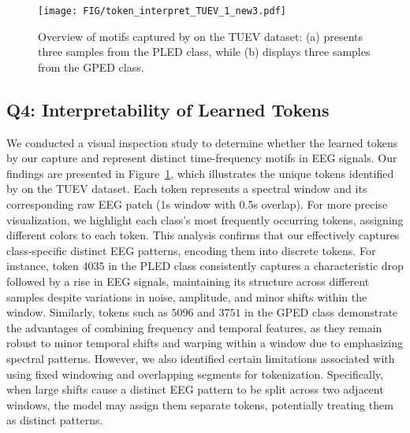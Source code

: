 
\begin{figure}[t]
    \centering
    \texttt{[image: FIG/token\_interpret\_TUEV\_1\_new3.pdf]}
    \caption{Overview of motifs captured by \tokenizer on the TUEV dataset: (a) presents three samples from the PLED class, while (b) displays three samples from the GPED class.
    }
    \label{fig:interpret_TUEV_1}
\end{figure}
\subsection{Q4: Interpretability of Learned Tokens}
\label{sec:Q6}
We conducted a visual inspection study to determine whether the learned tokens by our \tokenizer capture and represent distinct time-frequency motifs in EEG signals. Our findings are presented in Figure~\ref{fig:interpret_TUEV_1}, which illustrates the unique tokens identified by \tokenizer on the TUEV dataset. 
Each token represents a spectral window and its corresponding raw EEG patch (1s window with 0.5s overlap). For more precise visualization, we highlight each class's most frequently occurring tokens, assigning different colors to each token. This analysis confirms that our \tokenizer effectively captures class-specific distinct EEG patterns, encoding them into discrete tokens. For instance, token $4035$ in the PLED class consistently captures a characteristic drop followed by a rise in EEG signals, maintaining its structure across different samples despite variations in noise, amplitude, and minor shifts within the window. Similarly, tokens such as $5096$ and $3751$ in the GPED class demonstrate the advantages of combining frequency and temporal features, as they remain robust to minor temporal shifts and warping within a window due to emphasizing spectral patterns. However, we also identified certain limitations associated with using fixed windowing and overlapping segments for tokenization. Specifically, when large shifts cause a distinct EEG pattern to be split across two adjacent windows, the model may assign them separate tokens, potentially treating them as distinct patterns. 

